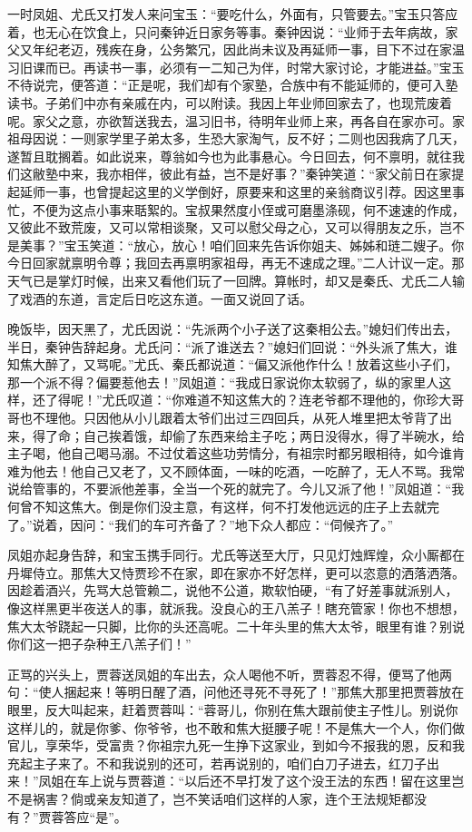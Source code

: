 \documentclass[12pt,oneside]{book}
\begin{document}
一时凤姐、尤氏又打发人来问宝玉：“要吃什么，外面有，只管要去。”宝玉只答应着，也无心在饮食上，只问秦钟近日家务等事。秦钟因说：“业师于去年病故，家父又年纪老迈，残疾在身，公务繁冗，因此尚未议及再延师一事，目下不过在家温习旧课而已。再读书一事，必须有一二知己为伴，时常大家讨论，才能进益。”宝玉不待说完，便答道：“正是呢，我们却有个家塾，合族中有不能延师的，便可入塾读书。子弟们中亦有亲戚在内，可以附读。我因上年业师回家去了，也现荒废着呢。家父之意，亦欲暂送我去，温习旧书，待明年业师上来，再各自在家亦可。家祖母因说：一则家学里子弟太多，生恐大家淘气，反不好；二则也因我病了几天，遂暂且耽搁着。如此说来，尊翁如今也为此事悬心。今日回去，何不禀明，就往我们这敝塾中来，我亦相伴，彼此有益，岂不是好事？”秦钟笑道：“家父前日在家提起延师一事，也曾提起这里的义学倒好，原要来和这里的亲翁商议引荐。因这里事忙，不便为这点小事来聒絮的。宝叔果然度小侄或可磨墨涤砚，何不速速的作成，又彼此不致荒废，又可以常相谈聚，又可以慰父母之心，又可以得朋友之乐，岂不是美事？”宝玉笑道：“放心，放心！咱们回来先告诉你姐夫、姊姊和琏二嫂子。你今日回家就禀明令尊；我回去再禀明家祖母，再无不速成之理。”二人计议一定。那天气已是掌灯时候，出来又看他们玩了一回牌。算帐时，却又是秦氏、尤氏二人输了戏酒的东道，言定后日吃这东道。一面又说回了话。

晚饭毕，因天黑了，尤氏因说：“先派两个小子送了这秦相公去。”媳妇们传出去，半日，秦钟告辞起身。尤氏问：“派了谁送去？”媳妇们回说：“外头派了焦大，谁知焦大醉了，又骂呢。”尤氏、秦氏都说道：“偏又派他作什么！放着这些小子们，那一个派不得？偏要惹他去！”凤姐道：“我成日家说你太软弱了，纵的家里人这样，还了得呢！”尤氏叹道：“你难道不知这焦大的？连老爷都不理他的，你珍大哥哥也不理他。只因他从小儿跟着太爷们出过三四回兵，从死人堆里把太爷背了出来，得了命；自己挨着饿，却偷了东西来给主子吃；两日没得水，得了半碗水，给主子喝，他自己喝马溺。不过仗着这些功劳情分，有祖宗时都另眼相待，如今谁肯难为他去！他自己又老了，又不顾体面，一味的吃酒，一吃醉了，无人不骂。我常说给管事的，不要派他差事，全当一个死的就完了。今儿又派了他！”凤姐道：“我何曾不知这焦大。倒是你们没主意，有这样，何不打发他远远的庄子上去就完了。”说着，因问：“我们的车可齐备了？”地下众人都应：“伺候齐了。”

凤姐亦起身告辞，和宝玉携手同行。尤氏等送至大厅，只见灯烛辉煌，众小厮都在丹墀侍立。那焦大又恃贾珍不在家，即在家亦不好怎样，更可以恣意的洒落洒落。因趁着酒兴，先骂大总管赖二，说他不公道，欺软怕硬，“有了好差事就派别人，像这样黑更半夜送人的事，就派我。没良心的王八羔子！瞎充管家！你也不想想，焦大太爷跷起一只脚，比你的头还高呢。二十年头里的焦大太爷，眼里有谁？别说你们这一把子杂种王八羔子们！”

正骂的兴头上，贾蓉送凤姐的车出去，众人喝他不听，贾蓉忍不得，便骂了他两句：“使人捆起来！等明日醒了酒，问他还寻死不寻死了！”那焦大那里把贾蓉放在眼里，反大叫起来，赶着贾蓉叫：“蓉哥儿，你别在焦大跟前使主子性儿。别说你这样儿的，就是你爹、你爷爷，也不敢和焦大挺腰子呢！不是焦大一个人，你们做官儿，享荣华，受富贵？你祖宗九死一生挣下这家业，到如今不报我的恩，反和我充起主子来了。不和我说别的还可，若再说别的，咱们白刀子进去，红刀子出来！”凤姐在车上说与贾蓉道：“以后还不早打发了这个没王法的东西！留在这里岂不是祸害？倘或亲友知道了，岂不笑话咱们这样的人家，连个王法规矩都没有？”贾蓉答应“是”。
\end{document}
